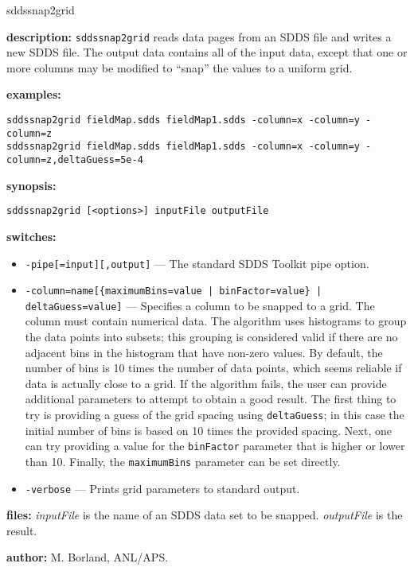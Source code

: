 \begin{sddsprog}{sddssnap2grid}
  \item \textbf{description:}
    \verb|sddssnap2grid| reads data pages from an SDDS file and writes a new SDDS file.
    The output data contains all of the input data, except that one or more columns may be
    modified to ``snap'' the values to a uniform grid.
  \item \textbf{examples:}
  \begin{verbatim}
sddssnap2grid fieldMap.sdds fieldMap1.sdds -column=x -column=y -column=z
sddssnap2grid fieldMap.sdds fieldMap1.sdds -column=x -column=y -column=z,deltaGuess=5e-4
  \end{verbatim}
  \item \textbf{synopsis:}
  \begin{verbatim}
sddssnap2grid [<options>] inputFile outputFile
  \end{verbatim}
  \item \textbf{switches:}
    \begin{itemize}
      \item \verb|-pipe[=input][,output]| --- The standard SDDS Toolkit pipe option.
      \item \verb!-column=name[{maximumBins=value | binFactor=value} | deltaGuess=value]! ---
        Specifies a column to be snapped to a grid. The column must contain numerical data.
        The algorithm uses histograms to group the data points into subsets; this grouping is
        considered valid if there are no adjacent bins in the histogram that have non-zero values.
        By default, the number of bins is 10 times the number of data points, which seems reliable
        if data is actually close to a grid. If the algorithm fails, the user can provide additional
        parameters to attempt to obtain a good result. The first thing to try is providing a guess of
        the grid spacing using \verb|deltaGuess|; in this case the initial number of bins is based on
        10 times the provided spacing. Next, one can try providing a value for the \verb|binFactor|
        parameter that is higher or lower than 10. Finally, the \verb|maximumBins| parameter can be set
        directly.
      \item \verb|-verbose| --- Prints grid parameters to standard output.
    \end{itemize}
  \item \textbf{files:}
    \emph{inputFile} is the name of an SDDS data set to be snapped. \emph{outputFile} is the result.
  \item \textbf{author:} M. Borland, ANL/APS.
\end{sddsprog}

